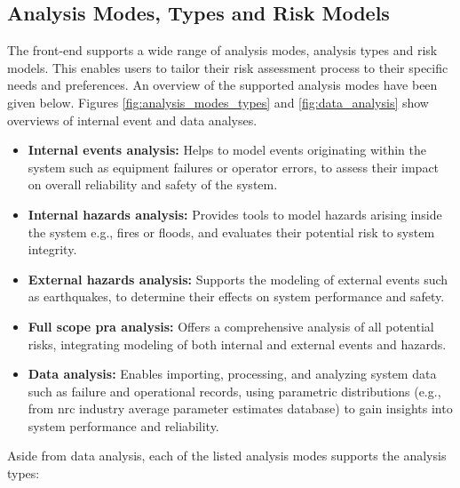 

\subsection{Analysis Modes, Types and Risk Models}

The front-end supports a wide range of analysis modes, analysis types and risk models. This enables users to tailor their risk assessment process to their specific needs and preferences. An overview of the supported analysis modes have been given below. Figures \ref{fig:analysis_modes_types} and \ref{fig:data_analysis} show overviews of internal event and data analyses.

\begin{itemize}
  \item \textbf{Internal events analysis:} Helps to model events originating within the system such as equipment failures or operator errors, to assess their impact on overall reliability and safety of the system.
  \item \textbf{Internal hazards analysis:} Provides tools to model hazards arising inside the system e.g., fires or floods, and evaluates their potential risk to system integrity.
  \item \textbf{External hazards analysis:} Supports the modeling of external events such as earthquakes, to determine their effects on system performance and safety.
  \item \textbf{Full scope \acrshort{pra} analysis:} Offers a comprehensive analysis of all potential risks, integrating modeling of both internal and external events and hazards.
  \item \textbf{Data analysis:} Enables importing, processing, and analyzing system data such as failure and operational records, using parametric distributions (e.g., from \acrshort{nrc} industry average parameter estimates database) to gain insights into system performance and reliability.
\end{itemize}

Aside from data analysis, each of the listed analysis modes supports the analysis types:

